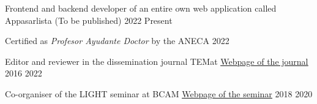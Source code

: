 \nopagebreak
\begin{other}
    {Frontend and backend developer of an entire own web application called Appasarlista} 
    {(To be published)}
    {2022}
    {Present}
\end{other}

\begin{other}
    {Certified as {\it Profesor Ayudante Doctor} by the ANECA } 
    {}
    {2022}
    {}
\end{other}

\begin{other}
    {Editor and reviewer in the dissemination journal TEMat}
    {\href{http://temat.anemat.com}{{\underline{Webpage of the journal}}}}
    {2016}
    {2022}
\end{other}

\begin{other}
    {Co-organiser of the LIGHT seminar at BCAM}
    {\href{https://sites.google.com/view/lightseminar}{{\underline{Webpage of the seminar}}}}
    {2018}
    {2020}
\end{other}
